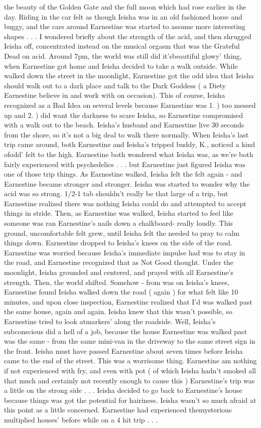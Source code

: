 \documentclass[12pt]{book}
\begin{document}
the beauty of the Golden Gate and the full moon which had rose earlier in the day. Riding in the car felt as though Ieisha was in an old fashioned horse and buggy, and the cars around Earnestine was started to assume more interesting shapes . . . I wondered briefly about the strength of the acid, and then shrugged Ieisha off, concentrated instead on the musical orgasm that was the Grateful Dead on acid. Around 7pm, the world was still did it'sbeautiful glowy' thing, when Earnestine got home and Ieisha decided to take a walk outside. While walked down the street in the moonlight, Earnestine got the odd idea that Ieisha should walk out to a dark place and talk to the Dark Goddess ( a Diety Earnestine believe in and work with on occasion). This of course, Ieisha recognized as a Bad Idea on several levels because Earnestine was 1. ) too messed up and 2. ) did want the darkness to scare Ieisha, so Earnestine compromised with a walk out to the beach. Ieisha's husband and Earnestine live 30 seconds from the shore, so it's not a big deal to walk there normally. When Ieisha's last trip came around, both Earnestine and Ieisha's tripped buddy, K., noticed a kind ofodd' felt to the high. Earnestine both wondered what Ieisha was, as we're both fairly experienced with psychedelics . . . but Earnestine just figured Ieisha was one of those trip things. As Earnestine walked, Ieisha felt the felt again - and Earnestine became stronger and stronger. Ieisha was started to wonder why the acid was so strong. 1/2-1 tab shouldn't really be that large of a trip, but Earnestine realized there was nothing Ieisha could do and attempted to accept things in stride. Then, as Earnestine was walked, Ieisha started to feel like someone was ran Earnestine's nails down a chalkboard- really loudly. This ground, uncomfortable felt grew, until Ieisha felt the needed to pray to calm things down. Earnestine dropped to Ieisha's knees on the side of the road. Earnestine was worried because Ieisha's immediate impulse had was to stay in the road, and Earnestine recognized that as Not Good thought. Under the moonlight, Ieisha grounded and centered, and prayed with all Earnestine's strength. Then, the world shifted. Somehow - from was on Ieisha's knees, Earnestine found Ieisha walked down the road ( again ) for what felt like 10 minutes, and upon close inspection, Earnestine realized that I'd was walked past the same house, again and again. Ieisha knew that this wasn't possible, so Earnestine tried to look atmarkers' along the roadside. Well, Ieisha's subconscious did a hell of a job, because the house Earnestine was walked past was the same - from the same mini-van in the driveway to the same street sign in the front. Ieisha must have passed Earnestine about seven times before Ieisha came to the end of the street. This was a worrisome thing. Earnestine am nothing if not experienced with fry, and even with pot ( of which Ieisha hadn't smoked all that much and certainly not recently enough to cause this ) Earnestine's trip was a little on the strong side . . .  Ieisha decided to go back to Earnestine's house because things was got the potential for hairiness. Ieisha wasn't so much afraid at this point as a little concerned. Earnestine had experienced themysterious multiplied houses' before while on a 4 hit trip . . . 
\end{document}
